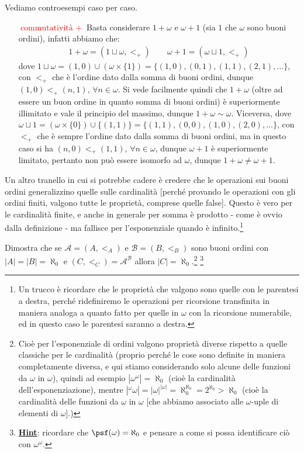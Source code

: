 \documentclass[11pt]{scrartcl}
\begin{document}
\begin{soln}
	Vediamo controesempi caso per caso.
	\begin{itemize}
		\item[\textcolor{red}{$\boxed{\text{commutatività $+$}}$}] Basta considerare $1+\omega$ e $\omega + 1$ (sia $1$ che $\omega$ sono buoni ordini), infatti abbiamo che:
		\begin{align*}
			1+\omega = (1 \sqcup \omega, <_+) \qquad \omega + 1 = (\omega \sqcup 1, <_+) 
		\end{align*}
		dove $1 \sqcup \omega = (1,0)\cup (\omega \times \{1\}) = \{(1,0),(0,1),(1,1),(2,1),\ldots\}$, con $<_+$ che è l'ordine dato dalla somma di buoni ordini, dunque $(1,0)<_+(n,1)$, $\forall n \in \omega$. Si vede facilmente
		quindi che $1 + \omega$ (oltre ad essere un buon ordine in quanto somma di buoni ordini) è superiormente illimitato e vale il principio del massimo, dunque $1+\omega \sim \omega$. Viceversa, dove $\omega \sqcup 1 = (\omega \times \{0\})\cup \{(1,1)\} = \{(1,1),(0,0),(1,0),(2,0),\ldots\}$,
		con $<_+$ che è sempre l'ordine dato dalla somma di buoni ordini, ma in questo caso si ha $(n,0) <_+ (1,1)$, $\forall n \in \omega$, dunque $\omega + 1$ è superiormente limitato, pertanto non può essere isomorfo ad $\omega$, dunque $1 + \omega \ne \omega + 1$.
	\end{itemize}
\end{soln}

Un altro tranello in cui si potrebbe cadere è credere che le operazioni sui buoni ordini generalizzino quelle sulle cardinalità [perché provando le operazioni con gli ordini finiti, valgono tutte le proprietà, comprese quelle false]. Questo è vero per le cardinalità finite, e anche in generale 
per somma è prodotto - come è ovvio dalla definizione - ma fallisce per l'esponenziale quando è infinito.\footnote{Un trucco è ricordare che le proprietà che valgono sono quelle con le parentesi a destra, perché ridefiniremo le operazioni per ricorsione transfinita in maniera analoga a quanto fatto per quelle in $\omega$ con la ricorsione numerabile,
ed in questo caso le parentesi saranno a destra.}

\begin{exercise}
	Dimostra che se $\mathcal A = (A,<_A)$ e $\mathcal B = (B,<_B)$ sono buoni ordini con $|A| = |B| = \aleph_0$ e $(C,<_C) = \mathcal A^{\mathcal B}$ allora $|C| = \aleph_0$.\footnote{Cioè per l'esponenziale di ordini valgono proprietà diverse rispetto a quelle classiche per le cardinalità (proprio perché le cose sono definite in maniera completamente diversa, e qui stiamo considerando solo alcune delle funzioni da $\omega$ in $\omega$),
	quindi ad esempio $|\omega^\omega| = \aleph_0$ (cioè la cardinalità dell'esponenziazione), mentre $|{}^\omega \omega| = |\omega|^{|\omega|} = \aleph_0^{\aleph_0} = 2^{\aleph_0}>\aleph_0$ (cioè la cardinalità delle funzioni da $\omega$ in $\omega$ [che abbiamo associato alle $\omega$-uple di elementi di $\omega$].)} \footnote{\underline{\textbf{Hint}}: ricordare che $\psf(\omega) = \aleph_0$ e pensare a come si possa identificare ciò con $\omega^\omega$.}
\end{exercise}
\end{document}
